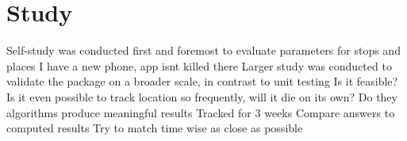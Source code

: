 \section{Study}
Self-study was conducted first and foremost to evaluate parameters for stops and places
I have a new phone, app isnt killed there
Larger study was conducted to validate the package on a broader scale, in contrast to unit testing
Is it feasible? Is it even possible to track location so frequently, will it die on its own?
Do they algorithms produce meaningful results
Tracked for 3 weeks
Compare answers to computed results
Try to match time wise as close as possible

